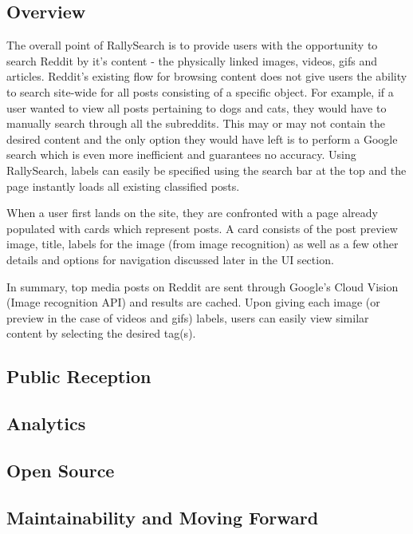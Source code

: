 \documentclass[msc,oneside]{ubcthesis}%
\begin{document}
\subsection{Overview}
The overall point of RallySearch is to provide users with the opportunity to search Reddit by it's content - the physically linked images, videos, gifs and articles. Reddit's existing flow for browsing content does not give users the ability to search site-wide for all posts consisting of a specific object. For example, if a user wanted to view all posts pertaining to dogs and cats, they would have to manually search through all the subreddits. This may or may not contain the desired content and the only option they would have left is to perform a Google search which is even more inefficient and guarantees no accuracy. Using RallySearch, labels can easily be specified using the search bar at the top and the page instantly loads all existing classified posts.

When a user first lands on the site, they are confronted with a page already populated with cards which represent posts. A card consists of the post preview image, title, labels for the image (from image recognition) as well as a few other details and options for navigation discussed later in the UI section.

In summary, top media posts on Reddit are sent through Google's Cloud Vision (Image recognition API) and results are cached. Upon giving each image (or preview in the case of videos and gifs) labels, users can easily view similar content by selecting the desired tag(s). 

\subsection{Public Reception}

\subsection{Analytics}

\subsection{Open Source}

\subsection{Maintainability and Moving Forward}

\newpage %
\pagestyle{fancy}\rhead{}\cfoot{}\rfoot{\thepage}

\end{document}

